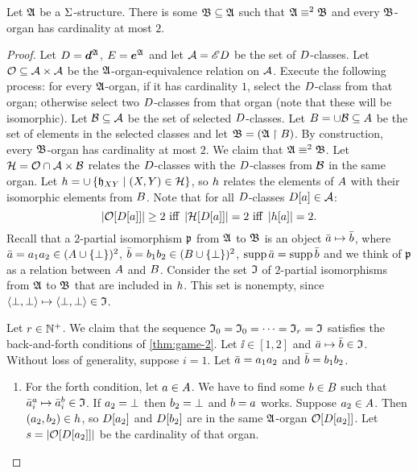 \begin{lemma}\label{lem:twovar-organ-2}
Let $\mathfrak{A}$ be a $\mathrm{\Sigma}$-structure. There is some $\mathfrak{B} \subseteq \mathfrak{A}$ such
that $\mathfrak{A} \equiv^{2} \mathfrak{B}$ and every $\mathfrak{B}$-organ has cardinality at most
$2$.
\end{lemma}
\begin{proof}
Let $D = \bm{d}^{\mathfrak{A}}$, $E = \bm{e}^{\mathfrak{A}}$ and 
let $\mathcal{A} = {\mathscr{E}D}$ be the set of $D$-classes.
Let $\mathcal{O} \subseteq {\mathcal{A}\times\mathcal{A}}$ be the
$\mathfrak{A}$-organ-equivalence relation on $\mathcal{A}$.
Execute the following process: for every $\mathfrak{A}$-organ, if it has cardinality
$1$, select the $D$-class from that organ; otherwise select two
$D$-classes from that organ (note that these will be isomorphic).
Let $\mathcal{B} \subseteq \mathcal{A}$ be the set of selected $D$-classes.
Let $B = \cup \mathcal{B} \subseteq A$ be the set of elements in the
selected classes and let $\mathfrak{B} = (\mathfrak{A} \restriction B)$.
By construction, every $\mathfrak{B}$-organ has cardinality at most $2$.
We claim that $\mathfrak{A} \equiv^{2} \mathfrak{B}$.
Let $\mathcal{H} = \mathcal{O} \cap \mathcal{A}\times\mathcal{B}$ relates the $D$-classes with the
$D$-classes from $\mathcal{B}$ in the same organ.
Let $h = \cup \left\{\mathfrak{h}_{XY}\mathrel{}\middle|\mathrel{}(X,Y) \in \mathcal{H}\right\}$, so
$h$ relates the elements of $A$ with their isomorphic elements from
$B$.
Note that for all $D$-classes $D[a] \in \mathcal{A}$:
\begin{equation}\label{eq:twovar-organ-2}
  \mifff{
  \card{\Org[\relD[\ea]]} \geq 2}{
  \card{\selH[\relD[\ea]]} = 2}{
  \card{\selh[\ea]} = 2}.
\end{equation}
Recall that a $2$-partial isomorphism $\mathfrak{p}$ from $\mathfrak{A}$ to $\mathfrak{B}$ is an
object $\bar{a} \mapsto \bar{b}$, where
$\bar{a} = a_{1}a_{2} \in (A \cup \left\{\bot\right\})^2$,
$\bar{b}  = b_{1}b_{2} \in (B \cup \left\{\bot\right\})^2$,
$\operatorname{supp}\bar{a} = \operatorname{supp}\bar{b}$
and we think of $\mathfrak{p}$ as a relation between $A$ and $B$.
Consider the set $\mathfrak{I}$ of $2$-partial isomorphisms from
$\mathfrak{A}$ to $\mathfrak{B}$ that are included in $h$.
This set is nonempty, since $\left\langle \bot,\bot \right\rangle\mapsto\left\langle \bot,\bot \right\rangle \in \mathfrak{I}$.

Let $r \in \mathbb{N}^{+}$.
We claim that the sequence $\mathfrak{I}_{0} = \mathfrak{I}_{0} = \dots = \mathfrak{I}_{r} = \mathfrak{I}$
satisfies the back-and-forth conditions of \cref{thm:game-2}.
Let $\ii \in [1,2]$ and $\bar{a} \mapsto \bar{b} \in \mathfrak{I}$.
Without loss of generality, suppose $i = 1$.
Let $\bar{a} = a_{1}a_{2}$ and $\bar{b} = b_{1}b_{2}$.
\begin{enumerate}
  \item For the forth condition, let $a \in A$.
  We have to find some $b \in B$ such that
  $\bar{a}_{i}^{a} \mapsto \bar{a}_{i}^{b} \in \mathfrak{I}$.
  If $a_{2} = \bot$ then $b_{2} = \bot$ and $b = a$ works.
  Suppose $a_{2} \in A$. Then $(a_{2},b_{2}) \in h$, so
  $D[a_{2}]$ and $D[b_{2}]$ are in the same $\mathfrak{A}$-organ
  $\mathcal{O}[D[a_{2}]]$.
  Let $s = \left|\mathcal{O}[D[a_{2}]]\right|$ be the cardinality of that organ.
 

\end{enumerate}
\end{proof}
